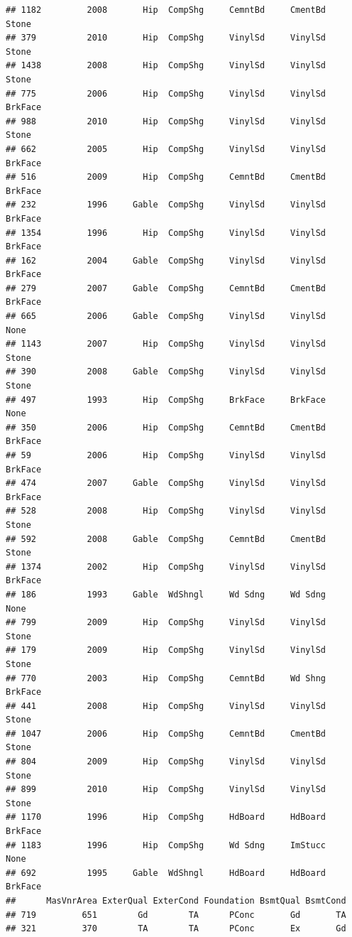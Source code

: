 \documentclass[]{article}
\begin{document}
\begin{verbatim}
## 1182         2008       Hip  CompShg     CemntBd     CmentBd      Stone
## 379          2010       Hip  CompShg     VinylSd     VinylSd      Stone
## 1438         2008       Hip  CompShg     VinylSd     VinylSd      Stone
## 775          2006       Hip  CompShg     VinylSd     VinylSd    BrkFace
## 988          2010       Hip  CompShg     VinylSd     VinylSd      Stone
## 662          2005       Hip  CompShg     VinylSd     VinylSd    BrkFace
## 516          2009       Hip  CompShg     CemntBd     CmentBd    BrkFace
## 232          1996     Gable  CompShg     VinylSd     VinylSd    BrkFace
## 1354         1996       Hip  CompShg     VinylSd     VinylSd    BrkFace
## 162          2004     Gable  CompShg     VinylSd     VinylSd    BrkFace
## 279          2007     Gable  CompShg     CemntBd     CmentBd    BrkFace
## 665          2006     Gable  CompShg     VinylSd     VinylSd       None
## 1143         2007       Hip  CompShg     VinylSd     VinylSd      Stone
## 390          2008     Gable  CompShg     VinylSd     VinylSd      Stone
## 497          1993       Hip  CompShg     BrkFace     BrkFace       None
## 350          2006       Hip  CompShg     CemntBd     CmentBd    BrkFace
## 59           2006       Hip  CompShg     VinylSd     VinylSd    BrkFace
## 474          2007     Gable  CompShg     VinylSd     VinylSd    BrkFace
## 528          2008       Hip  CompShg     VinylSd     VinylSd      Stone
## 592          2008     Gable  CompShg     CemntBd     CmentBd      Stone
## 1374         2002       Hip  CompShg     VinylSd     VinylSd    BrkFace
## 186          1993     Gable  WdShngl     Wd Sdng     Wd Sdng       None
## 799          2009       Hip  CompShg     VinylSd     VinylSd      Stone
## 179          2009       Hip  CompShg     VinylSd     VinylSd      Stone
## 770          2003       Hip  CompShg     CemntBd     Wd Shng    BrkFace
## 441          2008       Hip  CompShg     VinylSd     VinylSd      Stone
## 1047         2006       Hip  CompShg     CemntBd     CmentBd      Stone
## 804          2009       Hip  CompShg     VinylSd     VinylSd      Stone
## 899          2010       Hip  CompShg     VinylSd     VinylSd      Stone
## 1170         1996       Hip  CompShg     HdBoard     HdBoard    BrkFace
## 1183         1996       Hip  CompShg     Wd Sdng     ImStucc       None
## 692          1995     Gable  WdShngl     HdBoard     HdBoard    BrkFace
##      MasVnrArea ExterQual ExterCond Foundation BsmtQual BsmtCond
## 719         651        Gd        TA      PConc       Gd       TA
## 321         370        TA        TA      PConc       Ex       Gd

\end{verbatim}
\end{document}
